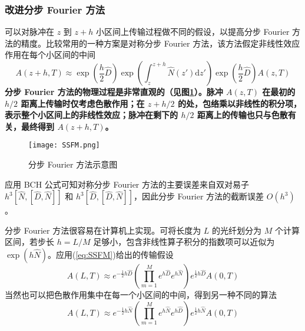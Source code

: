 \subsubsection{改进分步 Fourier 方法}
可以对脉冲在 $z$ 到 $z+h$ 小区间上传输过程做不同的假设，以提高分步 Fourier 方法的精度。比较常用的一种方案是对称分步 Fourier 方法，该方法假定非线性效应作用在每个小区间的中间
\begin{equation}
    A(z+h,T)\approx\exp\left(\frac{h}{2}\hat{D}\right)\exp\left(\int_z^{z+h}\hat{N}(z')\mathrm{d}z'\right)\exp\left(\frac{h}{2}\hat{D}\right)A(z,T)
    \label{eq:SSFM}
\end{equation}
{\bfseries 分步 Fourier 方法的物理过程是非常直观的（见图\ref{fig:SSFM}）。脉冲 $A(z,T)$ 在最初的 $h/2$ 距离上传输时仅考虑色散作用；在 $z+h/2$ 的处，包络乘以非线性的积分项，表示整个小区间上的非线性效应；脉冲在剩下的 $h/2$ 距离上的传输也只与色散有关，最终得到 $A(z+h,T)$\cite{Agrawal}。}
\begin{figure}[btp]
    \centering
    \texttt{[image: SSFM.png]}
    \caption{分步 Fourier 方法示意图}
    \label{fig:SSFM}
\end{figure}

应用 BCH 公式可知对称分步 Fourier 方法的主要误差来自双对易子 $h^3[\hat{N},[\hat{D},\hat{N}]]$ 和 $h^3[\hat{D},[\hat{D},\hat{N}]]$，因此分步 Fourier 方法的截断误差 $O(h^3)$。

分步 Fourier 方法很容易在计算机上实现。可将长度为 $L$ 的光纤划分为 $M$ 个计算区间，若步长 $h=L/M$ 足够小，包含非线性算子积分的指数项可以近似为 $\exp(h\hat{N})$。应用(\ref{eq:SSFM})给出的传输假设
\begin{equation}
    A(L,T)\approx e^{-\frac{1}{2}h\hat{D}}\left(\prod_{m=1}^Me^{h\hat{D}}e^{h\hat{N}}\right)e^{\frac{1}{2}h\hat{D}}A(0,T)
\end{equation}
当然也可以把色散作用集中在每一个小区间的中间，得到另一种不同的算法
\begin{equation}
    A(L,T)\approx e^{-\frac{1}{2}h\hat{N}}\left(\prod_{m=1}^Me^{h\hat{N}}e^{h\hat{D}}\right)e^{\frac{1}{2}h\hat{N}}A(0,T)
    \label{eq:1/2N->D->1/2N}
\end{equation}

